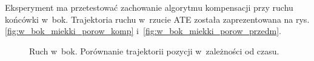 Eksperyment ma przetestować zachowanie algorytmu kompensacji przy ruchu końcówki w~bok. Trajektoria ruchu w~rzucie ATE została zaprezentowana na rys. \ref{fig:w_bok_miekki_porow_komp} i~\ref{fig:w_bok_miekki_porow_przedm}.
\begin{figure}[H]
	\centering
	\hfill
	
	\hfill

	\caption{Ruch w~bok. Porównanie trajektorii pozycji w~zależności od czasu.}
	\label{fig:w_bok_miekki_a}

\end{figure}

